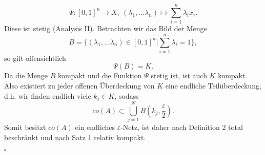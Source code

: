 \documentclass[a4paper,fontsize=8pt,DIV=1]{article}
\theoremstyle{plain}
\begin{document}
\begin{equation}
\Psi: [0,1]^n \to X, \ (\lambda_1, ... \lambda_n) \mapsto \sum_{i=1}^n\lambda_i x_i.
\end{equation}
Diese ist stetig (Analysis II). Betrachten wir das Bild der Menge 
\begin{equation}
B = \{(\lambda_1, ... \lambda_n) \in [0,1]^n | \sum_{i=1}^n \lambda_i = 1 \},
\end{equation}
so gilt offensichtlich
\begin{equation}
\Psi(B) = K.
\end{equation}
Da die Menge $B$ kompakt und die Funktion $\Psi$ stetig ist, ist auch $K$ kompakt. Also existiert zu jeder offenen Überdeckung von $K$ eine endliche Teilüberdeckung, d.h. wir finden endlich viele $k_j \in K$, sodass
\begin{equation}
co(A) \subset \bigcup_{j=1}^N B(k_j,\frac{\varepsilon}{2}).
\end{equation}
Somit besitzt $co(A)$ ein endliches $\varepsilon$-Netz, ist daher nach Definition 2 total beschränkt und nach Satz 1 relativ kompakt.
\begin{flushright}
	$\square$
\end{flushright}
	
\end{document}
